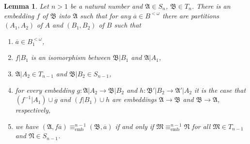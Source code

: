 \documentclass{ndjflart}
\theoremstyle{plain}
\newtheorem{lemma}[conjecture]{Lemma}
\theoremstyle{definition}
\numberwithin{equation}{section}
\DeclareMathOperator{\emb}{emb}
\begin{document}
\begin{lemma}\label{left_emb}
Let $n>1$ be a natural number and $\mathfrak{A} \in S_n$, $\mathfrak{B}\in T_n$.
There is an embedding $f$ of $\mathfrak{B}$ into $\mathfrak{A}$ such that for any
$\overline{a} \in B^{<\omega}$ there are partitions $(A_1,A_2)$ of $A$ and
$(B_1,B_2)$ of $B$ such that
\begin{enumerate}
\item $\overline{a} \in B_1^{<\omega}$,
\item $f | B_1$ is an isomorphism between $\mathfrak{B} | B_1$ and $\mathfrak{A} | A_1$,
\item $\mathfrak{A}|A_2 \in T_{n-1}$ and $\mathfrak{B}|B_2 \in S_{n-1}$,
\item for every embedding $g \colon \mathfrak{A}|A_2\rightarrow \mathfrak{B}|B_2$
and $h \colon \mathfrak{B}' |B_2\rightarrow \mathfrak{A}'|A_2$ it is the case
that $(f^{-1}|A_1) \cup g$ and $(f|B_1) \cup h$ are embeddings
$\mathfrak{A} \rightarrow \mathfrak{B}$ and
$\mathfrak{B} \rightarrow \mathfrak{A}$, respectively,
\item we have
$(\mathfrak{A}, f\overline{a}) \equiv^{n-1}_{\emb} (\mathfrak{B}, \overline{a})$
if and only if $\mathfrak{M} \equiv^{n-1}_{\emb} \mathfrak{N}$ for all
$\mathfrak{M} \in T_{n-1}$ and $\mathfrak{N} \in S_{n-1}$.
\end{enumerate}
\end{lemma}
\end{document}
